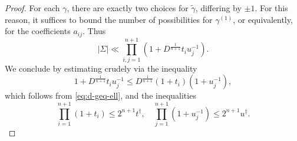 \documentclass[reqno]{amsart}
\theoremstyle{plain} \newtheorem{theorem} {Theorem}
\theoremstyle{definition} \newtheorem{definition} [theorem] {Definition}
\theoremstyle{itplain} %
\numberwithin{equation}{section}
\numberwithin{theorem}{section}
\renewcommand{\leq}{\leqslant}
\begin{document}
\begin{proof}
  For each $\gamma$, there are exactly two choices for $\tilde{\gamma}$, differing by $\pm 1$.  For this reason, it suffices to bound the number of possibilities for $\gamma^{(1)}$, or equivalently, for the coefficients $a_{i j}$.  Thus
  \begin{equation}\label{eq:sigma-ll-prod_i}
    |\Sigma| \ll
    \prod_{i,j= 1}^{n+1} \left( 1 + D ^{\frac{1}{ n + 1}} t_i u_j^{-1} \right).
  \end{equation}
  We conclude by estimating crudely via the inequality
  \begin{equation*}
    1 + D ^{\frac{1}{ n + 1}} t_i u_j^{-1}
    \leq
    D ^{\frac{1}{ n + 1}} ( 1 + t_i ) ( 1 + u_j^{-1} ),
  \end{equation*}
  which follows from \eqref{eq:d-geq-ell}, and the inequalities
  \begin{equation*}
    \prod_{i=1}^{n+1} (1 + t_i) \leq 2^{n+1} t ^\dagger ,
    \quad 
    \prod_{j=1}^{n+1} (1 + u_j^{-1}) \leq 2^{n+1} u ^\dagger.
  \end{equation*}
\end{proof}
\end{document}
